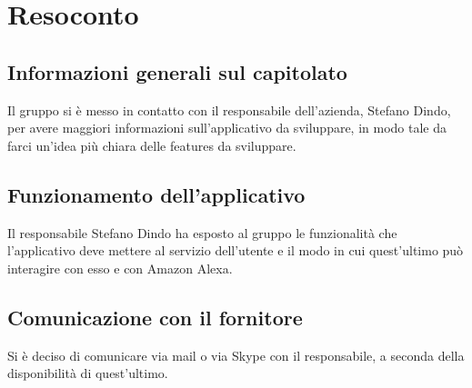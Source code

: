 \section{Resoconto} 
\subsection{Informazioni generali sul capitolato}
Il gruppo si è messo in contatto con il responsabile dell'azienda, Stefano Dindo, per avere maggiori informazioni sull'applicativo da sviluppare, in modo tale da farci un'idea più chiara delle features da sviluppare.
\subsection{Funzionamento dell'applicativo}
Il responsabile Stefano Dindo ha esposto al gruppo le funzionalità che l'applicativo deve mettere al servizio dell'utente e il modo in cui quest'ultimo può interagire con esso e con Amazon Alexa.
\subsection{Comunicazione con il fornitore}
Si è deciso di comunicare via mail o via Skype con il responsabile, a seconda della disponibilità di quest'ultimo.